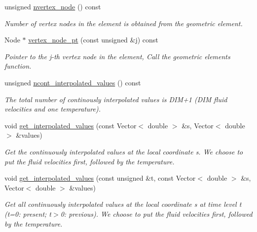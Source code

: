 \begin{DoxyCompactItemize}
unsigned \hyperlink{classoomph_1_1RefineableBuoyantQCrouzeixRaviartElement_a868eb9a7f06469da529dbbc5b1efe34e}{nvertex\+\_\+node} () const
\begin{DoxyCompactList}\small\item\em Number of vertex nodes in the element is obtained from the geometric element. \end{DoxyCompactList}\item 
Node $\ast$ \hyperlink{classoomph_1_1RefineableBuoyantQCrouzeixRaviartElement_a39d79b2fe742148c2d3856ed05ad78db}{vertex\+\_\+node\+\_\+pt} (const unsigned \&j) const
\begin{DoxyCompactList}\small\item\em Pointer to the j-\/th vertex node in the element, Call the geometric element\textquotesingle{}s function. \end{DoxyCompactList}\item 
unsigned \hyperlink{classoomph_1_1RefineableBuoyantQCrouzeixRaviartElement_a98f094a1c3080905d0e90f5ac6ebd1b6}{ncont\+\_\+interpolated\+\_\+values} () const
\begin{DoxyCompactList}\small\item\em The total number of continously interpolated values is D\+I\+M+1 (D\+IM fluid velocities and one temperature). \end{DoxyCompactList}\item 
void \hyperlink{classoomph_1_1RefineableBuoyantQCrouzeixRaviartElement_aa89e116d612b3530edd2b0666d25cf01}{get\+\_\+interpolated\+\_\+values} (const Vector$<$ double $>$ \&s, Vector$<$ double $>$ \&values)
\begin{DoxyCompactList}\small\item\em Get the continuously interpolated values at the local coordinate s. We choose to put the fluid velocities first, followed by the temperature. \end{DoxyCompactList}\item 
void \hyperlink{classoomph_1_1RefineableBuoyantQCrouzeixRaviartElement_af178c04f0e6ee09a5d05574fcd68ac41}{get\+\_\+interpolated\+\_\+values} (const unsigned \&t, const Vector$<$ double $>$ \&s, Vector$<$ double $>$ \&values)
\begin{DoxyCompactList}\small\item\em Get all continuously interpolated values at the local coordinate s at time level t (t=0\+: present; t$>$0\+: previous). We choose to put the fluid velocities first, followed by the temperature. \end{DoxyCompactList}\item 

\end{DoxyCompactItemize}
